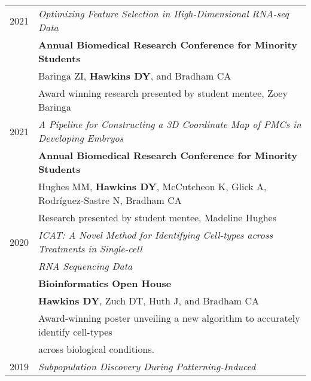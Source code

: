 \documentclass[a4paper,10pt]{report}
\begin{document}
\section{\color{linkcolour}{Posters and Presentations}}
\begin{longtable}{ll}
	\textsc{2021} & \emph{Optimizing Feature Selection in High-Dimensional RNA-seq Data}                                \\
	              & \textbf{Annual Biomedical Research Conference for Minority Students}                                \\
	              & \footnotesize Baringa ZI, \textbf{Hawkins DY}, and Bradham CA                                       \\
	              & \small{Award winning research presented by student mentee, Zoey Baringa}                            \\
	\textsc{2021} & \emph{A Pipeline for Constructing a 3D Coordinate Map of PMCs in Developing Embryos}                \\
	              & \textbf{Annual Biomedical Research Conference for Minority Students}                                \\
	              & \footnotesize Hughes MM, \textbf{Hawkins DY}, McCutcheon K, Glick A, Rodríguez-Sastre N, Bradham CA \\
	              & \small{Research presented by student mentee, Madeline Hughes}                                       \\
	\textsc{2020} & \emph{ICAT: A Novel Method for Identifying Cell-types across
	Treatments in Single-cell}                                                                                          \\
	              & \emph{RNA Sequencing Data}                                                                          \\
	              & \textbf{Bioinformatics Open House}                                                                  \\
	              & \footnotesize \textbf{Hawkins DY}, Zuch DT, Huth J, and Bradham CA                                  \\
	              & \small{Award-winning poster unveiling a new algorithm to accurately identify cell-types}            \\
	              & \small{across biological conditions.}                                                               \\
	\textsc{2019} & \emph{Subpopulation Discovery During Patterning-Induced
}
\end{longtable}
\end{document}
